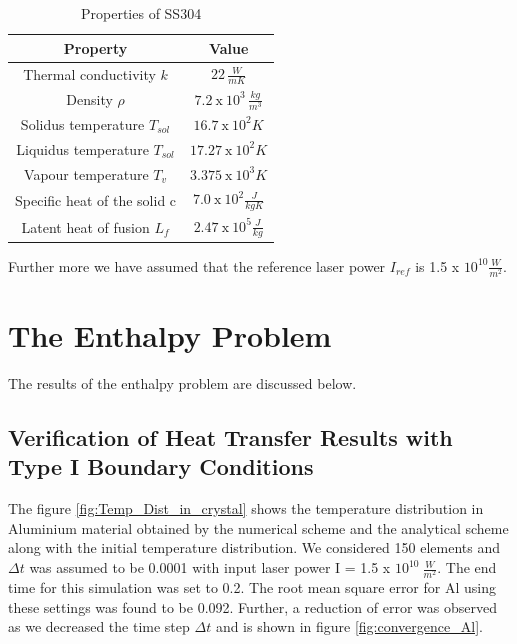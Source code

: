 \begin{table}[htbp]
    \centering
    \renewcommand{\arraystretch}{1.5} %
    \begin{tabular}{|c|c|}
        \hline
         Property & Value \\
         \hline
         Thermal conductivity $k$ & $22\, \frac{W}{mK}$\\
         \hline
         Density $\rho$ & $7.2\ \text{x} \ 10^3\, \frac{kg}{m^3}$\\
         \hline
         Solidus temperature $T_{sol}$ & $16.7\ \text{x} \ 10^2 K$\\
         \hline
         Liquidus temperature $T_{sol}$ & $17.27\ \text{x} \ 10^2 K$\\
         \hline
         Vapour temperature $T_v$ & $3.375 \ \text{x} \ 10^3 K$\\
         \hline
         Specific heat of the solid c & $7.0 \ \text{x} \ 10^2 \frac{J}{kg K}$\\
         \hline
         Latent heat of fusion $L_f$ & $2.47 \ \text{x} \ 10^5 \frac{J}{kg}$\\
         \hline
    \end{tabular}
    \caption{Properties of SS304}
    \label{table:SS304L}
\end{table}
Further more we have assumed that the reference laser power $I_{ref}$ is 1.5 x $10^{10} \frac{W}{m^2}$.
\section{The Enthalpy Problem\label{sec:env}}
The results of the enthalpy problem are discussed below.

\subsection{Verification of Heat Transfer Results with Type I Boundary Conditions}

The figure \ref{fig:Temp_Dist_in_crystal} shows the temperature distribution in Aluminium material obtained by the numerical scheme and the analytical scheme along with the initial temperature distribution. We considered 150 elements and $\Delta t$ was assumed to be 0.0001 with input laser power I = 1.5 x $10^{10} \ \frac{W}{m^2}$. The end time for this simulation was set to 0.2. The root mean square error for Al using these settings was found to be 0.092. Further, a reduction of error was observed as we decreased the time step $\Delta t$ and is shown in figure \ref{fig:convergence_Al}. 

